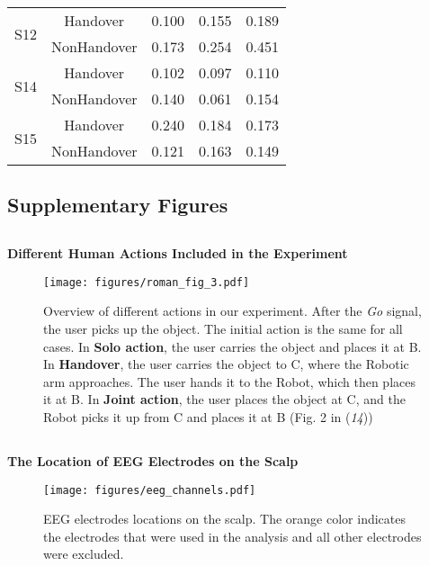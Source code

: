 \documentclass[10pt]{article}
\begin{document}
\begin{table}[h]
\begin{tabular}{ccccc}
        \midrule
        \multirow{2}{*}{S12} & Handover & 0.100 & 0.155 & 0.189 \\& NonHandover & 0.173 & 0.254 & 0.451 \\
        \midrule
        \multirow{2}{*}{S14} & Handover & 0.102 & 0.097 & 0.110 \\& NonHandover & 0.140 & 0.061 & 0.154 \\
        \midrule
        \multirow{2}{*}{S15} & Handover & 0.240 & 0.184 & 0.173 \\& NonHandover & 0.121 & 0.163 & 0.149 \\
        \bottomrule
    \end{tabular}
    \label{tab:erds}
\end{table}

\newpage
\subsection*{Supplementary Figures}

\subsection*{}
\textbf{Different Human Actions Included in the Experiment}
\begin{figure}[H]
       \centering
         \texttt{[image: figures/roman\_fig\_3.pdf]}  
     \caption{Overview of different actions in our experiment. After the \emph{Go} signal, the user picks up the object. The initial action is the same for all cases. In \textbf{Solo action}, the user carries the object and places it at B. In \textbf{Handover}, the user carries the object to C, where the Robotic arm approaches. The user hands it to the Robot, which then places it at B. In \textbf{Joint action}, the user places the object at C, and the Robot picks it up from C and places it at B (Fig. 2 in (\emph{14}))}
    \label{fig:experiment_overview}
\end{figure}

\subsection*{}
\textbf{The Location of EEG Electrodes on the Scalp}
\begin{figure}[H]
    \centering
    \texttt{[image: figures/eeg\_channels.pdf]}
    \caption{EEG electrodes locations on the scalp. The orange color indicates the electrodes that were used in the analysis and all other electrodes were excluded.}
    \label{fig:eeg_channels}
\end{figure}
\end{document}
